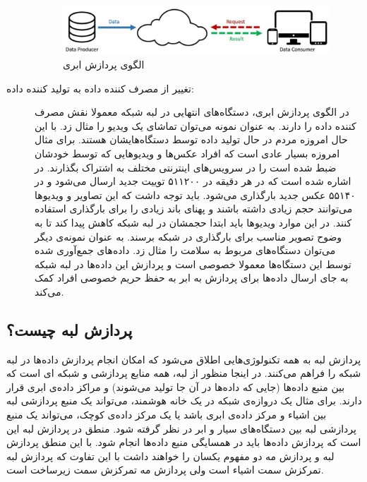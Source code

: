 \begin{description}
          \begin{figure}[h]
            \centerline{\includegraphics[width=10cm]{graphics/chapter_2/cloud_paradigm}}
            \caption{الگوی پردازش ابری \cite{shi2016edge}}
            \label{fig:chapter_2:cloud_paradigm}
          \end{figure}

        \item [تغییر از مصرف کننده داده به تولید کننده داده:]
          در الگوی پردازش ابری، دستگاه‌های انتهایی در لبه شبکه معمولا نقش مصرف کننده داده را دارند.
          به عنوان نمونه می‌توان تماشای یک ویدیو را مثال زد.
          با این حال امروزه مردم در حال تولید داده توسط دستگاه‌هایشان هستند.
          برای مثال امروزه بسیار عادی است که افراد عکس‌ها و ویدیو‌هایی که توسط خودشان ضبط شده است را در سرویس‌های اینترنتی مختلف به اشتراک بگذارند.
          در \cite{2019domo} اشاره شده است که در هر دقیقه در  ۵۱۱۲۰۰ توییت جدید ارسال می‌شود و در  ۵۵۱۴۰ عکس جدید بارگذاری می‌شود.
          باید توجه داشت که این تصاویر و ویدیوها می‌توانند حجم زیادی داشته باشند و پهنای باند زیادی را برای بارگذاری استفاده کنند.
          در این موارد ویدیو‌ها باید ابتدا حجمشان در لبه شبکه کاهش پیدا کند تا به وضوح تصویر مناسب برای بارگذاری در شبکه برسند.
          به عنوان نمونه‌ی دیگر می‌توان دستگاه‌های مربوط به سلامت را مثال زد.
          داده‌های جمع‌آوری شده توسط این دستگاه‌ها معمولا خصوصی است و پردازش این داده‌ها در لبه شبکه به جای ارسال داده‌ها برای پردازش به ابر به حفظ حریم خصوصی افراد کمک می‌کند.

      \end{description}
    
    \subsection{پردازش لبه چیست؟}
      پردازش لبه به همه تکنولوژی‌هایی اطلاق می‌شود که امکان انجام پردازش‌ داده‌ها در لبه شبکه را فراهم می‌کنند.
      در اینجا منظور از لبه، همه منابع پردازشی و شبکه ای است که بین منبع داده‌ها (جایی که داده‌ها در آن جا تولید می‌شوند) و مراکز داده‌ی ابری قرار دارند.
      برای مثال یک دروازه‌ی شبکه در یک خانه هوشمند، می‌تواند یک منبع پردازشی لبه بین اشیاء و مرکز داده‌ی ابری باشد یا یک مرکز داده‌ی کوچک، می‌تواند یک منبع پردازشی لبه بین دستگاه‌های سیار و ابر در نظر گرفته شود.
      منطق در پردازش لبه این است که پردازش داده‌ها باید در همسایگی منبع داده‌ها انجام شود.
      با این منطق پردازش لبه و پردازش مه دو مفهوم یکسان را خواهند داشت با این تفاوت که پردازش لبه تمرکزش سمت اشیاء است ولی پردازش مه تمرکزش سمت زیرساخت است.

